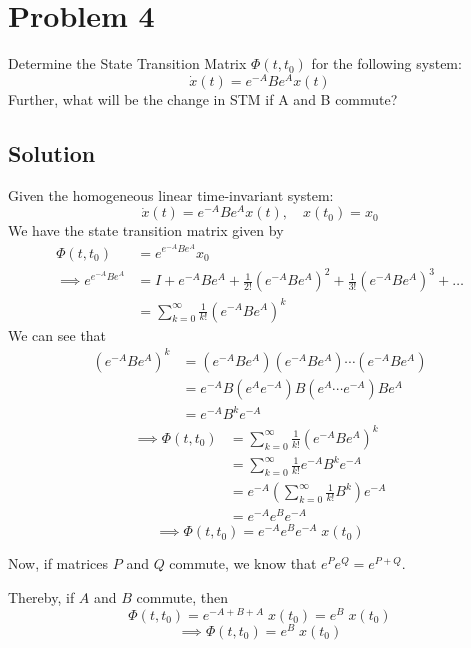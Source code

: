\section*{Problem 4}

Determine the State Transition Matrix \( \Phi(t,t_0) \) for the following system:
\begin{equation*}
    \dot x(t)
    =
    e^{-A} B e^A x(t)
\end{equation*}
Further, what will be the change in STM if A and B commute?

\subsection*{Solution}

Given the homogeneous linear time-invariant system:
\begin{equation*}
    \dot{x}(t) = e^{-A} B e^A x(t),
    \quad
    x(t_0) = x_0
\end{equation*}
We have the state transition matrix given by
\begin{align*}
    \Phi(t, t_0)
     & =
    e^{e^{-A} B e^A} x_0
    \\
    \implies
    e^{e^{-A} B e^A}
    & =
    I + e^{-A} B e^A + \frac{1}{2!} {(e^{-A} B e^A)}^2 + \frac{1}{3!} {(e^{-A} B e^A)}^3 + \ldots
    \\ & =
    \sum_{k=0}^{\infty} \frac{1}{k!} {(e^{-A} B e^A)}^k
\end{align*}
We can see that
\begin{align*}
    {(e^{-A} B e^A)}^k
     & =
     (e^{-A} B e^A)
     (e^{-A} B e^A)
     \cdots
     (e^{-A} B e^A)
    \\ & =
    e^{-A} B (e^A
    e^{-A}) B (e^A
    \cdots
    e^{-A}) B e^A
    \\ & =
    e^{-A} B^k e^{-A}
\end{align*}
\begin{align*}
    \implies
    \Phi(t, t_0)
    & =
    \sum_{k=0}^{\infty} \frac{1}{k!} {(e^{-A} B e^A)}^k
    \\ & =
    \sum_{k=0}^{\infty} \frac{1}{k!} e^{-A} B^k e^{-A}
    \\ & =
    e^{-A} \left( \sum_{k=0}^{\infty} \frac{1}{k!} B^k \right) e^{-A}
    \\ & =
    e^{-A} e^{B} e^{-A}
\end{align*}
\begin{equation*}
    \implies
    \boxed{
        \Phi(t, t_0)
        =
        e^{-A} e^{B} e^{-A} \; x(t_0)
    }
\end{equation*}

Now, if matrices \( P \) and \( Q \) commute, we know that \( e^P e^Q = e^{P + Q} \).

Thereby, if \( A \) and \( B \) commute, then
\begin{equation*}
    \Phi(t, t_0)
    =
    e^{-A + B + A} \; x(t_0)
    =
    e^{B} \; x(t_0)
\end{equation*}
\begin{equation*}
    \implies
    \boxed{
        \Phi(t, t_0)
        =
        e^{B} \; x(t_0)
    }
\end{equation*}
